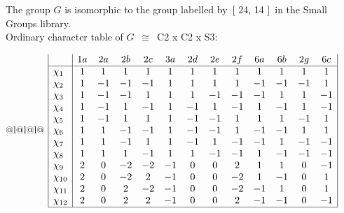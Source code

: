 \documentclass[varwidth=\maxdimen,border=10]{standalone}
\begin{document}
The group $G$ is isomorphic to the group labelled by\ [ 24, 14 ]\ in the Small Groups library.\\
Ordinary character table of $G$\ $\cong$\ C2 x C2 x S3:\\
\begin{center}
\begin{tabular}{@{}l@{}l@{}l@{}}
\hline
\(\begin{array}{|l|cccccccccccc|}
  & 1a & 2a & 2b & 2c & 3a & 2d & 2e & 2f & 6a & 6b & 2g & 6c\\ \hline
\chi_{1} & 1 & 1 & 1 & 1 & 1 & 1 & 1 & 1 & 1 & 1 & 1 & 1\\
\chi_{2} & 1 & -1 & -1 & -1 & 1 & 1 & 1 & 1 & -1 & -1 & -1 & 1\\
\chi_{3} & 1 & -1 & -1 & 1 & 1 & 1 & -1 & -1 & -1 & 1 & 1 & -1\\
\chi_{4} & 1 & -1 & 1 & -1 & 1 & -1 & 1 & -1 & 1 & -1 & 1 & -1\\
\chi_{5} & 1 & -1 & 1 & 1 & 1 & -1 & -1 & 1 & 1 & 1 & -1 & 1\\
\chi_{6} & 1 & 1 & -1 & -1 & 1 & -1 & -1 & 1 & -1 & -1 & 1 & 1\\
\chi_{7} & 1 & 1 & -1 & 1 & 1 & -1 & 1 & -1 & -1 & 1 & -1 & -1\\
\chi_{8} & 1 & 1 & 1 & -1 & 1 & 1 & -1 & -1 & 1 & -1 & -1 & -1\\
\chi_{9} & 2 & 0 & -2 & -2 & -1 & 0 & 0 & 2 & 1 & 1 & 0 & -1\\
\chi_{10} & 2 & 0 & -2 & 2 & -1 & 0 & 0 & -2 & 1 & -1 & 0 & 1\\
\chi_{11} & 2 & 0 & 2 & -2 & -1 & 0 & 0 & -2 & -1 & 1 & 0 & 1\\
\chi_{12} & 2 & 0 & 2 & 2 & -1 & 0 & 0 & 2 & -1 & -1 & 0 & -1\\
\hline
\end{array}\)\\
\end{tabular}
\end{center}
\end{document}

